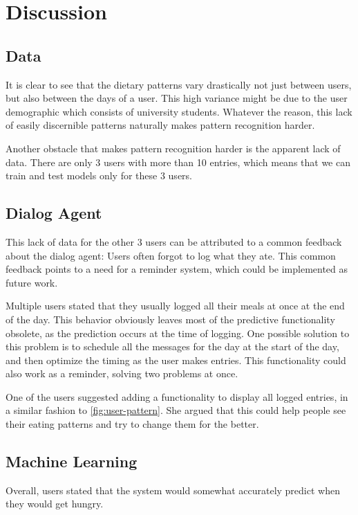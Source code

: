 
\chapter{Discussion}\label{chapter:discussion}

\section{Data}
It is clear to see that the dietary patterns vary drastically not just between users, but also between the days of a user.
This high variance might be due to the user demographic which consists of university students.
Whatever the reason, this lack of easily discernible patterns naturally makes pattern recognition harder.

Another obstacle that makes pattern recognition harder is the apparent lack of data.
There are only 3 users with more than 10 entries, which means that we can train and test models only for these 3 users.

\section{Dialog Agent}
This lack of data for the other 3 users can be attributed to a common feedback about the dialog agent:
Users often forgot to log what they ate.
This common feedback points to a need for a reminder system, which could be implemented as future work.

Multiple users stated that they usually logged all their meals at once at the end of the day.
This behavior obviously leaves most of the predictive functionality obsolete, as the prediction occurs at the time of logging.
One possible solution to this problem is to schedule all the messages for the day at the start of the day, and then optimize the timing as the user makes entries.
This functionality could also work as a reminder, solving two problems at once.

One of the users suggested adding a functionality to display all logged entries, in a similar fashion to \autoref{fig:user-pattern}.
She argued that this could help people see their eating patterns and try to change them for the better.

\section{Machine Learning}
Overall, users stated that the system would somewhat accurately predict when they would get hungry.

